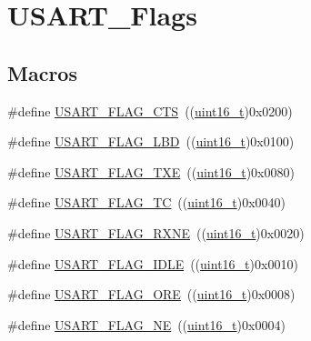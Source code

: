 \hypertarget{group___u_s_a_r_t___flags}{}\section{U\+S\+A\+R\+T\+\_\+\+Flags}
\label{group___u_s_a_r_t___flags}
\subsection*{Macros}
\begin{DoxyCompactItemize}
\item 
\#define \hyperlink{group___u_s_a_r_t___flags_ga94b7272319cca88a65075d5cb6048441}{U\+S\+A\+R\+T\+\_\+\+F\+L\+A\+G\+\_\+\+C\+TS}~((\hyperlink{_p_e___types_8h_a1f1825b69244eb3ad2c7165ddc99c956}{uint16\+\_\+t})0x0200)
\item 
\#define \hyperlink{group___u_s_a_r_t___flags_ga27be6517de20ce14711f71dcd5a7b91f}{U\+S\+A\+R\+T\+\_\+\+F\+L\+A\+G\+\_\+\+L\+BD}~((\hyperlink{_p_e___types_8h_a1f1825b69244eb3ad2c7165ddc99c956}{uint16\+\_\+t})0x0100)
\item 
\#define \hyperlink{group___u_s_a_r_t___flags_ga7129f13333f2a7218838cc32fe507bfa}{U\+S\+A\+R\+T\+\_\+\+F\+L\+A\+G\+\_\+\+T\+XE}~((\hyperlink{_p_e___types_8h_a1f1825b69244eb3ad2c7165ddc99c956}{uint16\+\_\+t})0x0080)
\item 
\#define \hyperlink{group___u_s_a_r_t___flags_gae7b85c9e2cc86af5bbc8b8d8b854410f}{U\+S\+A\+R\+T\+\_\+\+F\+L\+A\+G\+\_\+\+TC}~((\hyperlink{_p_e___types_8h_a1f1825b69244eb3ad2c7165ddc99c956}{uint16\+\_\+t})0x0040)
\item 
\#define \hyperlink{group___u_s_a_r_t___flags_ga11d6b70c8f00216b6d8a43790dfdcf2f}{U\+S\+A\+R\+T\+\_\+\+F\+L\+A\+G\+\_\+\+R\+X\+NE}~((\hyperlink{_p_e___types_8h_a1f1825b69244eb3ad2c7165ddc99c956}{uint16\+\_\+t})0x0020)
\item 
\#define \hyperlink{group___u_s_a_r_t___flags_gac2f1ccc91a834f9cbec3f058872b972a}{U\+S\+A\+R\+T\+\_\+\+F\+L\+A\+G\+\_\+\+I\+D\+LE}~((\hyperlink{_p_e___types_8h_a1f1825b69244eb3ad2c7165ddc99c956}{uint16\+\_\+t})0x0010)
\item 
\#define \hyperlink{group___u_s_a_r_t___flags_gabdb285b5c1876d93f9c802f9304538d5}{U\+S\+A\+R\+T\+\_\+\+F\+L\+A\+G\+\_\+\+O\+RE}~((\hyperlink{_p_e___types_8h_a1f1825b69244eb3ad2c7165ddc99c956}{uint16\+\_\+t})0x0008)
\item 
\#define \hyperlink{group___u_s_a_r_t___flags_ga81781d27ffc8b85dfaf7b7b791229547}{U\+S\+A\+R\+T\+\_\+\+F\+L\+A\+G\+\_\+\+NE}~((\hyperlink{_p_e___types_8h_a1f1825b69244eb3ad2c7165ddc99c956}{uint16\+\_\+t})0x0004)

\end{DoxyCompactItemize}
